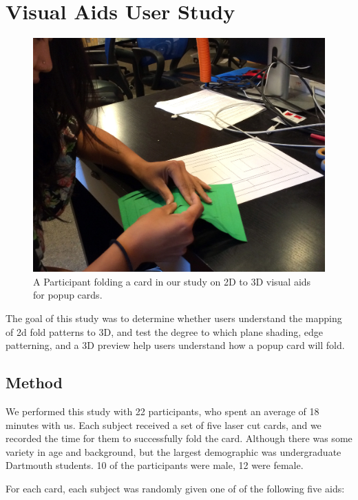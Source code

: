\section{Visual Aids User Study}\label{visual-aids-user-study}

\begin{figure}[htbp]
\centering
\includegraphics{figures/51_User_Study_Visual_Aids/kikofoldling.jpg}
\caption{A Participant folding a card in our study on 2D to 3D visual
aids for popup cards.}
\end{figure}

The goal of this study was to determine whether users understand the
mapping of 2d fold patterns to 3D, and test the degree to which plane
shading, edge patterning, and a 3D preview help users understand how a
popup card will fold.

\subsection{Method}\label{method}

We performed this study with 22 participants, who spent an average of 18
minutes with us. Each subject received a set of five laser cut cards,
and we recorded the time for them to successfully fold the card.
Although there was some variety in age and background, but the largest
demographic was undergraduate Dartmouth students. 10 of the participants
were male, 12 were female.

For each card, each subject was randomly given one of of the following
five aids:

